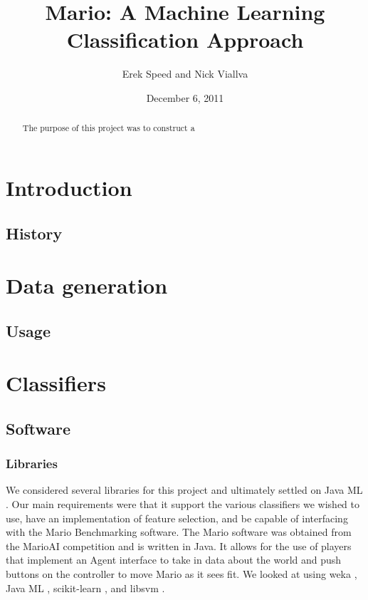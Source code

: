 \documentclass[]{article}   %
\begin{document}
\title{Mario: A Machine Learning Classification Approach}   %
\author{Erek Speed and Nick Viallva}         %
\date{December 6, 2011}    %
\maketitle

\begin{abstract}
 The purpose of this project was to construct a 
\end{abstract}


\section{Introduction}     %
\subsection{History}       %

\section{Data generation}     %
\subsection{Usage}         %

\section{Classifiers}
\subsection{Software}
\subsubsection{Libraries}
We considered several libraries for this project and ultimately settled on Java ML \cite{javaml}. Our main requirements were that it support the various classifiers we wished to use, have an implementation of feature selection, and be capable of interfacing with the Mario Benchmarking \cite{mariobenchmark} software. The Mario software was obtained from the MarioAI competition and is written in Java. It allows for the use of players that implement an Agent interface to take in data about the world and push buttons on the controller to move Mario as it sees fit. We looked at using weka \cite{weka}, Java ML \cite{javaml}, scikit-learn \cite{scikit}, and libsvm \cite{libsvm}. 
\end{document}
